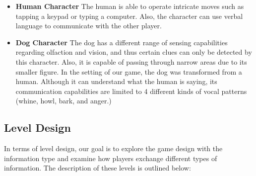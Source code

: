 \documentclass{sigchi}
\begin{document}
\begin{itemize}
\item \textbf{Human Character}\newline
The human is able to operate intricate moves such as tapping a keypad or typing a computer.
Also, the character can use verbal language to communicate with the other player.
\item \textbf{Dog Character}\newline
The dog has a different range of sensing capabilities regarding olfaction and vision, and thus certain clues can only be detected by this character.
Also, it is capable of passing through narrow areas due to its smaller figure.
In the setting of our game, the dog was transformed from a human.
Although it can understand what the human is saying, its communication capabilities are limited to 4 different kinds of vocal patterns (whine, howl, bark, and anger.)
\end{itemize}

\subsection{Level Design}

In terms of level design, our goal is to explore the game design with the information type and examine how players exchange different types of information. The description of these levels is outlined below:
\end{document}
